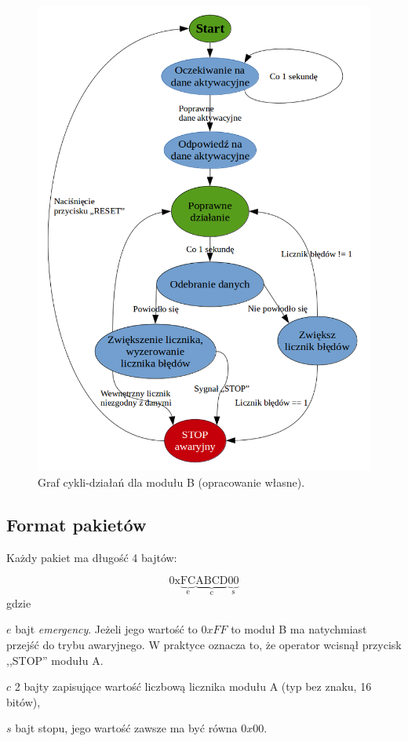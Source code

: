 \begin{figure}[H]
	\centering
	\includegraphics[scale=0.8]{schemas/cycle_action_B.png}
	\caption{\label{fig:cycle_action_B}Graf cykli-działań dla modułu B (opracowanie własne).}
\end{figure}

\subsection{Format pakietów}
\label{subsec:format_pakietow}

Każdy pakiet ma długość 4 bajtów:

\begin{equation}
0 \mathrm{x} \underbrace{\mathrm{FC}}_\text{e}  \underbrace{\mathrm{ABCD}}_\text{c} \underbrace{00}_\text{s}
\end{equation}
gdzie
\begin{eqwhere}[2cm]
	\item[$e$] bajt \textit{emergency}. Jeżeli jego wartość to $0xFF$ to moduł B ma natychmiast przejść do trybu awaryjnego. W praktyce oznacza to, że operator wcisnął przycisk ,,STOP'' modułu A.
	\item[$c$] 2 bajty zapisujące wartość liczbową licznika modułu A (typ bez znaku, 16 bitów),
	\item[$s$] bajt stopu, jego wartość zawsze ma być równa $0x00$.
\end{eqwhere}

